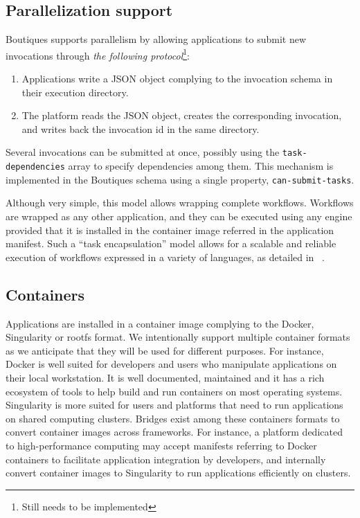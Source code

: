 \documentclass{article}
\newcommand{\boutiques}{Boutiques\xspace}
\newcommand{\notimplementedyet}[1]{\color{blue}\emph{#1}\footnote{Still needs to be implemented}\color{black}\xspace}
\begin{document}
\subsection{Parallelization support}
\label{sec:parallelization}
\boutiques supports parallelism by allowing applications to submit new
invocations through \notimplementedyet{the following protocol}:
\begin{enumerate}
\item Applications write a JSON object complying to the invocation
  schema in their execution directory.
\item The platform reads the JSON object, creates the corresponding
  invocation, and writes back the invocation id in the same directory.
\end{enumerate}
Several invocations can be submitted at once, possibly using the
\texttt{task-dependencies} array to specify dependencies among
them. This mechanism is implemented in the Boutiques schema using a
single property, \texttt{can-submit-tasks}.

Although very simple, this model allows wrapping complete
workflows. Workflows are wrapped as any other application, and they
can be executed using any engine provided that it is installed in the
container image referred in the application manifest. Such a ``task
encapsulation'' model allows for a scalable and reliable execution of
workflows expressed in a variety of languages, as detailed in
~\cite{glatard2016fgcs}.

\subsection{Containers}

Applications are installed in a container image complying to the
Docker, Singularity or rootfs format. We intentionally support
multiple container formats as we anticipate that they will be used for
different purposes. For instance, Docker is well suited for developers
and users who manipulate applications on their local workstation. It
is well documented, maintained and it has a rich ecosystem of tools to
help build and run containers on most operating systems. Singularity
is more suited for users and platforms that need to run applications
on shared computing clusters. Bridges exist among these containers
formats to convert container images across frameworks. For instance, a
platform dedicated to high-performance computing may accept manifests
referring to Docker containers to facilitate application integration
by developers, and internally convert container images to Singularity
to run applications efficiently on clusters.
\end{document}
